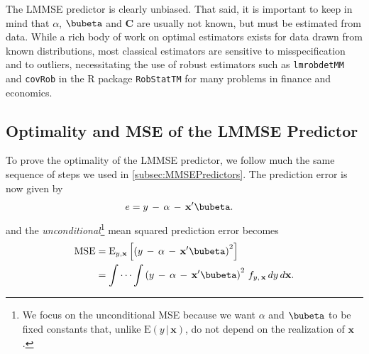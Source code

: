 \documentclass[graybox,envcountchap,sectrefs]{svmono}\usepackage[]{graphicx}\usepackage[]{xcolor}
\begin{document}
\begin{appendices}
The LMMSE predictor is clearly unbiased. That said, it is important
to keep in mind that  $\alpha$, $\bubeta$ and $\mathrm{\mathbf{C}}$
are usually not known, but must be estimated from data. While a rich
body of work on optimal estimators exists for data drawn from known
distributions, most classical estimators are sensitive to misspecification
and to outliers, necessitating the use of robust estimators such as
\texttt{lmrobdetMM} and \texttt{covRob} in the R package \texttt{RobStatTM}
for many problems in finance and economics.

\subsection{Optimality and MSE of the LMMSE Predictor\label{subsec:OptimalityLMMSE}}

To prove the optimality of the LMMSE predictor, we follow much the
same sequence of steps we used in \ref{subsec:MMSEPredictors}. The
prediction error is now given by
\begin{align*}
e & =y\,-\,\alpha\,-\,\mathrm{\mathbf{x}}^{\prime}\bubeta.
\end{align*}
and the \emph{unconditional}\footnote{We focus on the unconditional MSE because we want $\alpha$ and $\bubeta$
to be fixed constants that, unlike $\mathrm{E}\left(y\,|\,\mathbf{x}\right)$,
do not depend on the realization of $\mathbf{x}$.} mean squared prediction error becomes
\begin{align}
\mathrm{MSE} & =\mathrm{E}_{y,\mathbf{x}}\left[\left(y\,-\,\alpha\,-\,\mathrm{\mathbf{x}}^{\prime}\bubeta\right)^{2}\right]\nonumber \\
 & =\idotsint\left(y\,-\,\alpha\,-\,\mathrm{\mathbf{x}}^{\prime}\bubeta\right)^{2}\,f_{y,\,\mathrm{\mathbf{x}}}\,dy\,d\mathbf{x}.\label{eq:LMMSE1}
\end{align}


\end{appendices}
\end{document}
